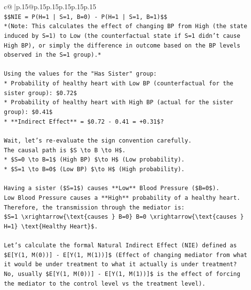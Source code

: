 \documentclass{article}
\begin{document}
{\begin{supertabular}{c@{$\;$}|p{.15\linewidth}@{}p{.15\linewidth}p{.15\linewidth}p{.15\linewidth}p{.15\linewidth}p{.15\linewidth}}
{{{\\ 
\texttt{\$\$NIE = P(H=1 | S=1, B=0) {-} P(H=1 | S=1, B=1)\$\$} \\
\texttt{*(Note: This calculates the effect of changing BP from High (the state induced by S=1) to Low (the counterfactual state if S=1 didn't cause High BP), or simply the difference in outcome based on the BP levels observed in the S=1 group).*} \\
\\ 
\texttt{Using the values for the "Has Sister" group:} \\
\texttt{*   Probability of healthy heart with Low BP (counterfactual for the sister group): \$0.72\$} \\
\texttt{*   Probability of healthy heart with High BP (actual for the sister group): \$0.41\$} \\
\texttt{*   **Indirect Effect** = \$0.72 {-} 0.41 = +0.31\$?} \\
\\ 
\texttt{Wait, let's re{-}evaluate the sign convention carefully.} \\
\texttt{The causal path is \$S \textbackslash{}to B \textbackslash{}to H\$.} \\
\texttt{*   \$S=0 \textbackslash{}to B=1\$ (High BP) \$\textbackslash{}to H\$ (Low probability).} \\
\texttt{*   \$S=1 \textbackslash{}to B=0\$ (Low BP) \$\textbackslash{}to H\$ (High probability).} \\
\\ 
\texttt{Having a sister (\$S=1\$) causes **Low** Blood Pressure (\$B=0\$).} \\
\texttt{Low Blood Pressure causes a **High** probability of a healthy heart.} \\
\texttt{Therefore, the transmission through the mediator is:} \\
\texttt{\$S=1 \textbackslash{}xrightarrow\{\textbackslash{}text\{causes \} B=0\} B=0 \textbackslash{}xrightarrow\{\textbackslash{}text\{causes \} H=1\} \textbackslash{}text\{Healthy Heart\}\$.} \\
\\ 
\texttt{Let's calculate the formal Natural Indirect Effect (NIE) defined as \$E{[}Y(1, M(0)){]} {-} E{[}Y(1, M(1)){]}\$ (Effect of changing mediator from what it would be under treatment to what it actually is under treatment? No, usually \$E{[}Y(1, M(0)){]} {-} E{[}Y(1, M(1)){]}\$ is the effect of forcing the mediator to the control level vs the treatment level).} \\
}}}
\end{supertabular}}
\end{document}
